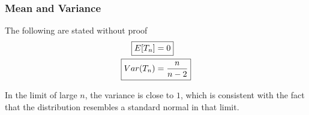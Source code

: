 \documentclass[../probability-notes.tex]{subfiles}
\begin{document}
    \subsubsection{Mean and Variance}
    The following are stated without proof
    \begin{align*}
        \Aboxed{E[T_{n}] &= 0}\\
        \Aboxed{Var(T_{n}) &= \frac{n}{n-2}}\\
    \end{align*}

    In the limit of large $n$, the variance is close to $1$, which is consistent with the fact that the distribution resembles a standard normal in that limit.
\end{document}
